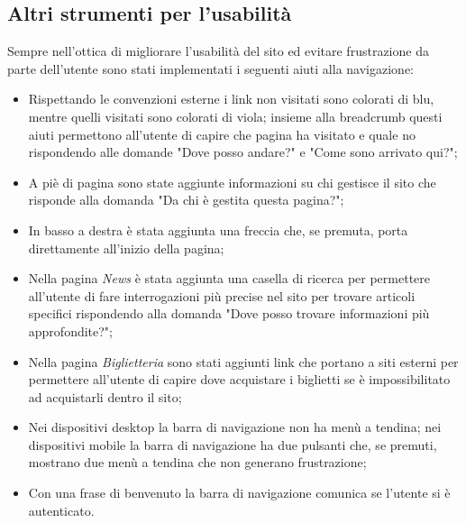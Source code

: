     \subsection{Altri strumenti per l'usabilità}
    Sempre nell'ottica di migliorare l'usabilità del sito ed evitare frustrazione da parte dell'utente sono stati implementati i seguenti aiuti alla navigazione:
    \begin{itemize}
        \item Rispettando le convenzioni esterne i link non visitati sono colorati di blu, mentre quelli visitati sono colorati di viola; insieme alla breadcrumb questi aiuti permettono all'utente di capire che pagina ha visitato e quale no rispondendo alle domande "Dove posso andare?" e "Come sono arrivato qui?";
        \item A piè di pagina sono state aggiunte informazioni su chi gestisce il sito che risponde alla domanda "Da chi è gestita questa pagina?";
        \item In basso a destra è stata aggiunta una freccia che, se premuta, porta direttamente all'inizio della pagina;
        \item Nella pagina \textit{News} è stata aggiunta una casella di ricerca per permettere all'utente di fare interrogazioni più precise nel sito per trovare articoli specifici rispondendo alla domanda "Dove posso trovare informazioni più approfondite?";
        \item Nella pagina \textit{Biglietteria} sono stati aggiunti link che portano a siti esterni per permettere all'utente di capire dove acquistare i biglietti se è impossibilitato ad acquistarli dentro il sito;
        \item Nei dispositivi desktop la barra di navigazione non ha menù a tendina; nei dispositivi mobile la barra di navigazione ha due pulsanti che, se premuti, mostrano due menù a tendina che non generano frustrazione;
        \item Con una frase di benvenuto la barra di navigazione comunica se l'utente si è autenticato.
    \end{itemize}

